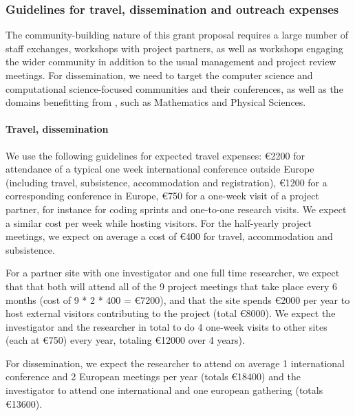 
\subsubsection{Guidelines for travel, dissemination and outreach expenses}
\label{sect:budget-details}

The community-building nature of this grant proposal requires a large
number of staff exchanges, workshops with project partners, as well as 
workshops engaging the wider community in addition to the usual
management and project review meetings. For dissemination, we need to
target the computer science and computational science-focused communities 
and their conferences, as well as the domains benefitting from \TheProject, such as
Mathematics and Physical Sciences.

\paragraph{Travel, dissemination}
\label{sect:budget-details-travel}

We use the following guidelines for expected travel expenses:
\euro{2200} for attendance of a typical one week international
conference outside Europe (including travel, subsistence,
accommodation and registration), \euro{1200} for a corresponding
conference in Europe, \euro{750} for a one-week visit of a  project
partner, for instance for coding sprints and one-to-one 
research visits. We expect a similar cost per week while hosting
visitors. For the half-yearly project meetings, we expect on average a
cost of \euro{400} for travel, accommodation and subsistence.

For a partner site with one investigator and one full time researcher,
we expect that that both will attend all of the 9 project meetings that take
place every 6 months (cost of 9 * 2 * 400 =
\euro{7200}), and that the site spends \euro{2000} per year to host
external visitors contributing to the project (total \euro{8000}). We
expect the investigator and the researcher in total to do 4 one-week visits
to other sites (each at \euro{750}) every year, totaling \euro{12000} over 4 years).

For dissemination, we expect the researcher to attend on average 1
international conference and 2 European meetings per year (totals
\euro{18400}) and the investigator to attend one international and one
european gathering (totals \euro{13600}).

